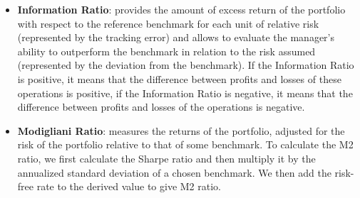 \documentclass[twocolumn]{article}
\begin{document}
\begin{itemize}
    \item \textbf{Information Ratio}: provides the amount of excess return of the portfolio with respect to the reference benchmark for each unit of relative risk (represented by the tracking error) and allows to evaluate the manager's ability to outperform the benchmark in relation to the risk assumed (represented by the deviation from the benchmark). If the Information Ratio is positive, it means that the difference between profits and losses of these operations is positive, if the Information Ratio is negative, it means that the difference between profits and losses of the operations is negative.
    \item \textbf{Modigliani Ratio}: measures the returns of the portfolio, adjusted for the risk of the portfolio relative to that of some benchmark. To calculate the M2 ratio, we first calculate the Sharpe ratio and then multiply it by the annualized standard deviation of a chosen benchmark. We then add the risk-free rate to the derived value to give M2 ratio.
\end{itemize}
\end{document}

